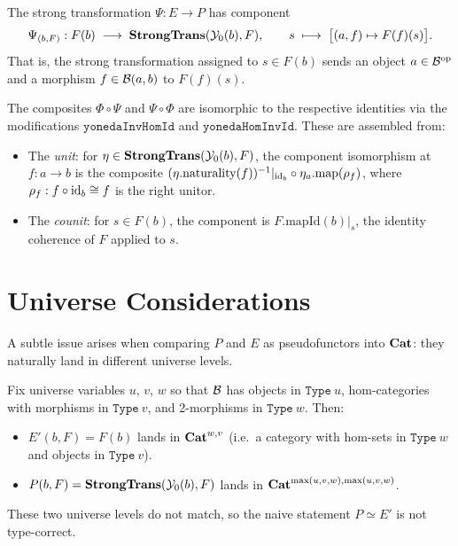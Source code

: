 \documentclass[12pt]{article}
\begin{document}
\begin{definition}
  The strong transformation $\Psi : E \to P$ has component
  \[
    \Psi_{(b,F)} : F(b) \;\longrightarrow\; \mathbf{StrongTrans}(\mathcal{Y}_0(b), F), \qquad
    s \;\longmapsto\; \bigl[(a, f) \mapsto F(f)(s)\bigr].
  \]
  That is, the strong transformation assigned to $s \in F(b)$ sends an object
  $a \in \mathcal{B}^{\mathrm{op}}$ and a morphism $f \in \mathcal{B}(a, b)$ to $F(f)(s)$.
\end{definition}

\begin{proposition}
  The composites $\Phi \circ \Psi$ and $\Psi \circ \Phi$ are isomorphic to the
  respective identities via the modifications $\mathtt{yonedaInvHomId}$ and
  $\mathtt{yonedaHomInvId}$.  These are assembled from:
  \begin{itemize}
    \item The \emph{unit}: for $\eta \in \mathbf{StrongTrans}(\mathcal{Y}_0(b), F)$, the component
          isomorphism at $f : a \to b$ is the composite
          $(\eta.\text{naturality}(f))^{-1}|_{\mathrm{id}_b} \circ \eta_a.\mathrm{map}(\rho_f)$,
          where $\rho_f : f \circ \mathrm{id}_b \cong f$ is the right unitor.
    \item The \emph{counit}: for $s \in F(b)$, the component is
          $F.\text{mapId}(b)|_s$, the identity coherence of $F$ applied to $s$.
  \end{itemize}
\end{proposition}

\section{Universe Considerations}\label{sec:universes}

A subtle issue arises when comparing $P$ and $E$ as pseudofunctors into $\mathbf{Cat}$:
they naturally land in different universe levels.

Fix universe variables $u$, $v$, $w$ so that $\mathcal{B}$ has objects in $\mathtt{Type}\ u$,
hom-categories with morphisms in $\mathtt{Type}\ v$, and 2-morphisms in
$\mathtt{Type}\ w$.  Then:
\begin{itemize}
  \item $E'(b, F) = F(b)$ lands in $\mathbf{Cat}^{w,v}$ (i.e.\ a category with
        hom-sets in $\mathtt{Type}\ w$ and objects in $\mathtt{Type}\ v$).
  \item $P(b, F) = \mathbf{StrongTrans}(\mathcal{Y}_0(b), F)$ lands in
        $\mathbf{Cat}^{\max(u,v,w), \max(u,v,w)}$.
\end{itemize}
These two universe levels do not match, so the naive statement
$P \simeq E'$ is not type-correct.
\end{document}
